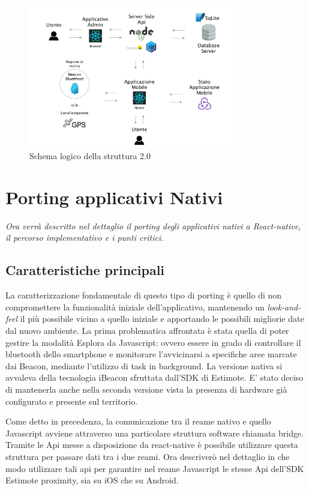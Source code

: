 \begin{figure}[h]
\centering
\includegraphics[width=0.8\textwidth]{images/stackAlakai.png}
\caption{Schema logico della struttura 2.0}
\end{figure}


\section{Porting applicativi Nativi}\vspace{5mm}
\emph{Ora verrà descritto nel dettaglio il porting degli applicativi nativi a React-native, il percorso implementativo e i punti critici.}
\vspace{5mm}
\subsection{Caratteristiche principali}\vspace{5mm}

La caratterizzazione fondamentale di questo tipo di porting è quello di non compromettere la funzionalità iniziale dell’applicativo, mantenendo un \emph{look-and-feel} il più possibile vicino a quello iniziale e apportando le possibili migliorie date dal nuovo ambiente. La prima problematica affrontata è stata quella di poter gestire la modalità Esplora da Javascript: ovvero essere in grado di controllare il bluetooth dello smartphone e monitorare l’avvicinarsi a specifiche aree marcate dai Beacon, mediante l'utilizzo di task in background. La versione nativa si avvaleva della tecnologia iBeacon sfruttata dall'SDK di Estimote. E' stato deciso di mantenerla anche nella seconda versione vista la presenza di hardware già configurato e presente sul territorio.  \vspace{5mm}

Come detto in precedenza, la comunicazione tra il reame nativo e quello Javascript avviene attraverso una particolare struttura software chiamata bridge. Tramite le Api messe a disposizione da react-native è possibile utilizzare questa struttura per passare dati tra i due reami. Ora descriverò nel dettaglio in che modo utilizzare tali api per garantire nel reame Javascript le stesse Api dell’SDK Estimote proximity, sia su iOS che su Android.\vspace{5mm}

